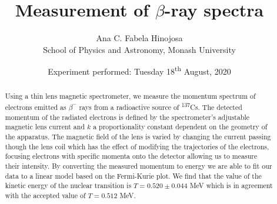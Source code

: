 \documentclass[10pt, a4paper]{article}
\title{Measurement of $\beta$-ray spectra}
\author{Ana C. Fabela Hinojosa\\
\small{School of Physics and Astronomy, Monash University}}
\date{Experiment performed: Tuesday 18\textsuperscript{th} August, 2020}
\begin{document}
\maketitle
\begin{abstract}
Using a thin lens magnetic spectrometer, we measure the momentum spectrum of electrons emitted as $\beta^{-}$ rays from a radioactive source of \textsuperscript{137}Cs. 
The detected momentum of the radiated electrons is defined by the spectrometer's adjustable magnetic lens current and $k$ a proportionality constant dependent on the geometry of the apparatus. The magnetic field of the lens is varied by changing the current passing though the lens coil which has the effect of modifying the trajectories of the electrons, focusing electrons with specific momenta onto the detector allowing us to measure their intensity. By converting the measured momentum to energy we are able to fit our data to a linear model based on the Fermi-Kurie plot. We find that the value of the kinetic energy of the nuclear transition is $T = 0.520 \pm 0.044$ MeV which is in agreement with the accepted value of $T = 0.512$ MeV\cite{SPA}.
\end{abstract}
\end{document}
